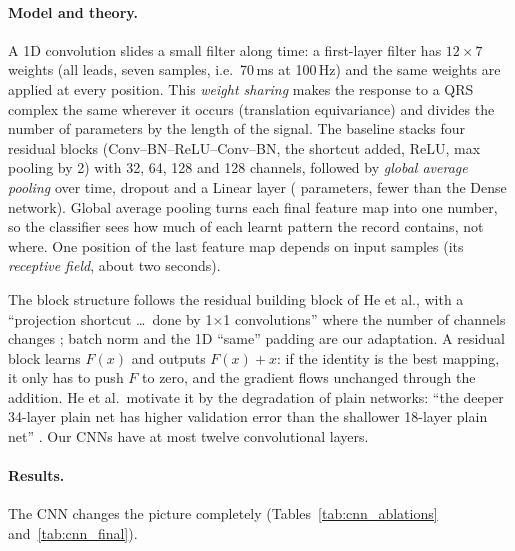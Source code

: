 \paragraph{Model and theory.} A 1D convolution slides a small filter along time: a first-layer
filter has $12\times7$ weights (all leads, seven samples, i.e.\ 70\,ms at 100\,Hz) and the same weights
are applied at every position. This \emph{weight sharing} makes the response to a QRS complex the same
wherever it occurs (translation equivariance) and divides the number of parameters by the length of
the signal. The baseline stacks four residual blocks (Conv--BN--ReLU--Conv--BN, the shortcut added,
ReLU, max pooling by 2) with 32, 64, 128 and 128 channels, followed by \emph{global average pooling}
over time, dropout and a Linear layer (\cnnParamsBase{} parameters, fewer than the Dense network).
Global average pooling turns each final feature map into one number, so the classifier sees how much
of each learnt pattern the record contains, not where. One position of the last feature map depends
on \cnnRfSamplesBase{} input samples (its \emph{receptive field}, about two seconds).

The block structure follows the residual building block of He et al., with a ``projection shortcut
\ldots\ done by 1$\times$1 convolutions'' where the number of channels changes
\cite[p.~4]{he2016deep}; batch norm and the 1D ``same'' padding are our adaptation. A residual block
learns $F(x)$ and outputs $F(x)+x$: if the identity is the best mapping, it only has to push $F$ to
zero, and the gradient flows unchanged through the addition. He et al.\ motivate it by the degradation
of plain networks: ``the deeper 34-layer plain net has higher validation error than the shallower
18-layer plain net'' \cite[p.~4]{he2016deep}. Our CNNs have at most twelve convolutional layers.

\paragraph{Results.} The CNN changes the picture completely (Tables~\ref{tab:cnn_ablations}
and~\ref{tab:cnn_final}).





